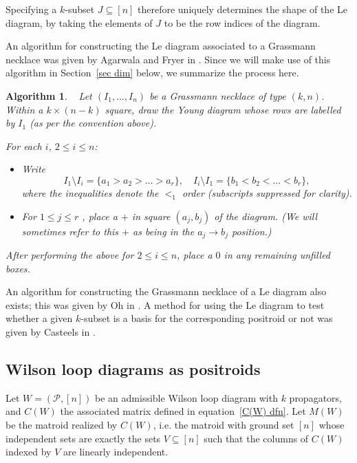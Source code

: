 \documentclass[11pt]{article}
\newcommand{\cP}{\mathcal{P}}
\newtheorem{algorithm}[thm]{Algorithm}
\theoremstyle{remark}
\theoremstyle{definition}
\begin{document}
Specifying a $k$-subset $J \subseteq [n]$ therefore uniquely determines the shape of the Le diagram, by taking the elements of $J$ to be the row indices of the diagram.

An algorithm for constructing the Le diagram associated to a Grassmann necklace was given by Agarwala and Fryer in \cite{reversingOh}. Since we will make use of this algorithm in Section~\ref{sec dim} below, we summarize the process here.
\begin{algorithm}\label{alg:GN to Le} \ \cite[Algorithm 2]{reversingOh}
Let $(I_1,\dots,I_n)$ be a Grassmann necklace of type $(k,n)$. Within a $k \times(n-k)$ square, draw the Young diagram whose rows are labelled by $I_1$ (as per the convention above).

For each $i$, $2 \leq i \leq n$:
\begin{itemize}
\item Write \[I_1 \setminus I_i = \{a_1 > a_2 > \dots > a_r\}, \quad I_i \setminus I_1 = \{b_1 < b_2 < \dots < b_r\},\]
where the inequalities denote the $<_1$ order (subscripts suppressed for clarity).
\item For $1 \leq j \leq r$ , place a $+$ in square $(a_j,b_j)$ of the diagram. (We will sometimes refer to this $+$ as being {\em in the $a_j \rightarrow b_j$ position}.)
\end{itemize}
After performing the above for $2 \leq i \leq n$, place a $0$ in any remaining unfilled boxes.
\end{algorithm}

An algorithm for constructing the Grassmann necklace of a Le diagram also exists; this was given by Oh in \cite{Oh}. A method for using the Le diagram to test whether a given $k$-subset is a basis for the corresponding positroid or not was given by Casteels in \cite{CasteelsPaths}.



\subsection{Wilson loop diagrams as positroids}\label{sec:WLD as positroids}


Let $W = (\cP,[n])$ be an admissible Wilson loop diagram with $k$ propagators, and $C(W)$ the associated matrix defined in equation~\eqref{C(W) dfn}. Let $M(W)$ be the matroid realized by $C(W)$, i.e. the matroid with ground set $[n]$ whose independent sets are exactly the sets $V \subseteq [n]$ such that the columns of $C(W)$ indexed by $V$ are linearly independent.
\end{document}
